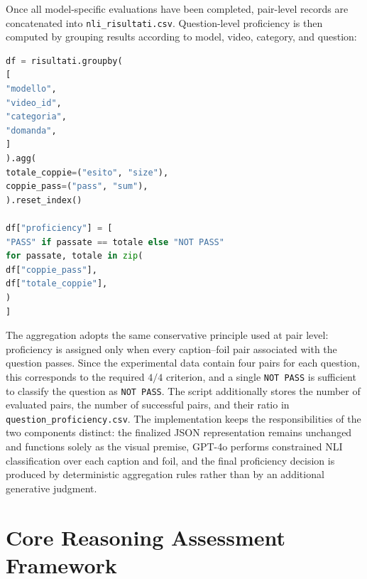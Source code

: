 Once all model-specific evaluations have been completed, pair-level records are concatenated into \texttt{nli\_risultati.csv}. Question-level proficiency is then computed by grouping results according to model, video, category, and question:
\begin{lstlisting}[language=Python]
df = risultati.groupby(
[
"modello",
"video_id",
"categoria",
"domanda",
]
).agg(
totale_coppie=("esito", "size"),
coppie_pass=("pass", "sum"),
).reset_index()

df["proficiency"] = [
"PASS" if passate == totale else "NOT PASS"
for passate, totale in zip(
df["coppie_pass"],
df["totale_coppie"],
)
]
\end{lstlisting}
The aggregation adopts the same conservative principle used at pair level: proficiency is assigned only when every caption--foil pair associated with the question passes. Since the experimental data contain four pairs for each question, this corresponds to the required $4/4$ criterion, and a single \texttt{NOT PASS} is sufficient to classify the question as \texttt{NOT PASS}. The script additionally stores the number of evaluated pairs, the number of successful pairs, and their ratio in \texttt{question\_proficiency.csv}. The implementation keeps the responsibilities of the two components distinct: the finalized JSON representation remains unchanged and functions solely as the visual premise, GPT-4o performs constrained NLI classification over each caption and foil, and the final proficiency decision is produced by deterministic aggregation rules rather than by an additional generative judgment.

\section{Core Reasoning Assessment Framework}
